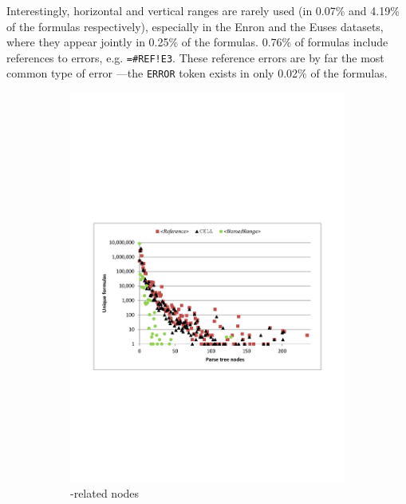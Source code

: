 \documentclass[times]{smrauth}
\begin{document}
Interestingly, horizontal and vertical ranges are rarely used (in 0.07\% and 4.19\% of the formulas respectively), especially in the Enron and the Euses datasets, where they appear jointly in 0.25\% of the formulas. 0.76\% of formulas include references to errors, e.g. \texttt{=\#REF!E3}. These reference errors are by far the most common type of error ---the \texttt{ERROR} token exists in only 0.02\% of the formulas.

\begin{figure}
	\centering
	\begin{subfigure}[b]{0.49\textwidth}
		\centering
		\includegraphics[width=1\textwidth]{img/nodesReference}
		\caption{-related nodes}
		\label{fig:nodesReference}
	\end{subfigure}
	~
	\begin{subfigure}[b]{0.49\textwidth}
		\centering

\end{subfigure}
\end{figure}
\end{document}
